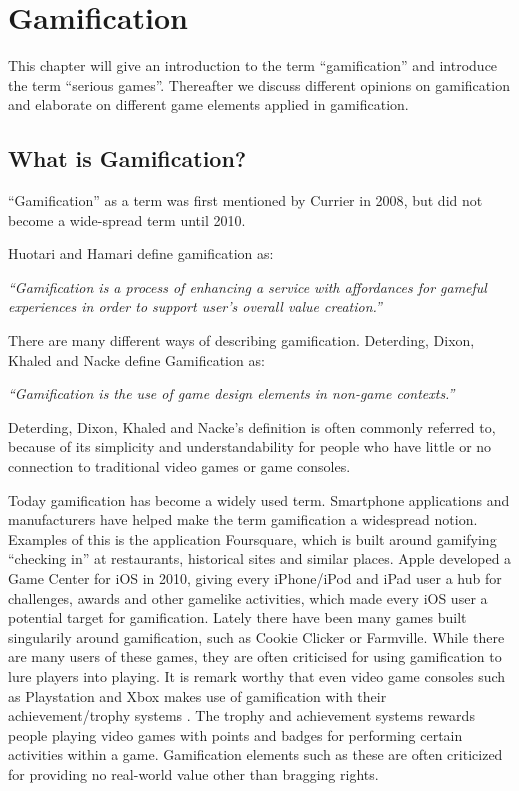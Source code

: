 \chapter{Gamification}
\label{chp:gamification}

This chapter will give an introduction to the term ``gamification'' and introduce the term ``serious games''. Thereafter we discuss different opinions on gamification and elaborate on different game elements applied in gamification.

\section{What is Gamification?}
\label{sec:whatisgamification}
``Gamification'' as a term was first mentioned by Currier in 2008\cite{gamificationcurrier}, but did not become a wide-spread term until 2010. 

Huotari and Hamari define gamification as:

\textit{``Gamification is a process of enhancing a service with affordances for gameful experiences in order to support user's overall value creation.''}\cite{huotari2012defining}

There are many different ways of describing gamification. Deterding, Dixon, Khaled and Nacke define Gamification as:

\textit{``Gamification is the use of game design elements in non-game
contexts.''}\cite{Deterding:2011:GDE:2181037.2181040}

Deterding, Dixon, Khaled and Nacke's definition is often commonly referred to, because of its simplicity and understandability for people who have little or no connection to traditional video games or game consoles.

Today gamification has become a widely used term. Smartphone applications and manufacturers have helped make the term gamification a widespread notion. Examples of this is the application Foursquare, which is built around gamifying ``checking in'' at restaurants, historical sites and similar places. Apple developed a Game Center for iOS in 2010, giving every iPhone/iPod and iPad user a hub for challenges, awards and other gamelike activities, which made every iOS user a potential target for gamification. Lately there have been many games built singularily around gamification, such as Cookie Clicker or Farmville. While there are many users of these games, they are often criticised for using gamification to lure players into playing. It is remark worthy that even video game consoles such as Playstation and Xbox makes use of gamification with their achievement/trophy systems . The trophy and achievement systems rewards people playing video games with points and badges for performing certain activities within a game. Gamification elements such as these are often criticized for providing no real-world value other than bragging rights.


